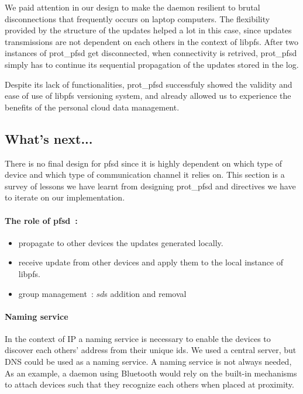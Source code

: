 We paid attention in our design to make the daemon resilient to brutal
disconnections that frequently occurs on laptop computers. The
flexibility provided by the structure of the updates helped a lot in
this case, since updates transmissions are not dependent on each
others in the context of libpfs. After two instances of prot\_pfsd get
disconnected, when connectivity is retrived, prot\_pfsd simply has
to continue its sequential propagation of the updates stored in the
log.

Despite its lack of functionalities, prot\_pfsd successfuly showed
the validity and ease of use of libpfs versioning system, and already 
allowed us to experience the benefits of the personal cloud data
management.

\subsection {What's next...}
\label {subsec:depfsd}

There is no final design for pfsd since it is highly dependent on
which type of device and which type of communication channel it relies
on. This section is a survey of lessons we have learnt from designing
prot\_pfsd and directives we have to iterate on our implementation.

\paragraph {The role of pfsd~:}
\begin{itemize}
\item propagate to other devices the updates generated locally.
\item receive update from other devices and apply them to the local
  instance of libpfs.
\item group management~: $sd$s addition and removal
\end{itemize}

\paragraph {Naming service}
In the context of IP a naming service is necessary to enable the
devices to discover each others' address from their unique ids. We
used a central server, but DNS could be used as a naming service. A
naming service is not always needed, As an example, a daemon using
Bluetooth would rely on the built-in mechanisms to attach devices such
that they recognize each others when placed at proximity.

